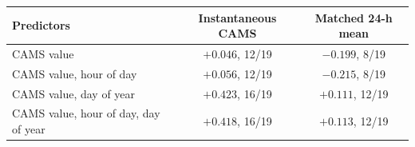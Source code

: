 \begin{tabular}{lcc}\toprule
Predictors & Instantaneous CAMS & Matched 24-h mean \\ \midrule
CAMS value & $+0.046$, 12/19 & $-0.199$, 8/19 \\
CAMS value, hour of day & $+0.056$, 12/19 & $-0.215$, 8/19 \\
CAMS value, day of year & $+0.423$, 16/19 & $+0.111$, 12/19 \\
CAMS value, hour of day, day of year & $+0.418$, 16/19 & $+0.113$, 12/19 \\
\bottomrule\end{tabular}
